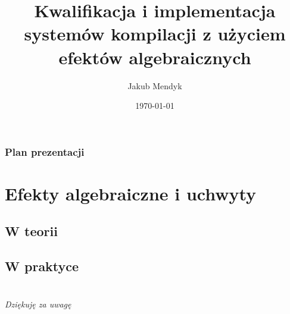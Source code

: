 \documentclass[polish, 13pt, usenames, dvipsnames]{beamer}
\title[Systemy kompilacji z użyciem efektów algebraicznych i uchwytów]{Kwalifikacja i implementacja systemów kompilacji z użyciem efektów algebraicznych}
\author{Jakub Mendyk}
\date{\today}
\institute[]{Instytut Informatyki Uniwersytetu Wrocławskiego}
\begin{document}
\begin{frame}
\titlepage
\end{frame}

\begin{frame}
\frametitle{Plan prezentacji}
\tableofcontents
\end{frame}





\section{Efekty algebraiczne i uchwyty}

\subsection{W teorii}


\subsection{W praktyce}










\section{}

\begin{frame}{}
  \vspace{2em}
  \centering
  \Large\emph{Dziękuję za uwagę}
\end{frame}
\end{document}
